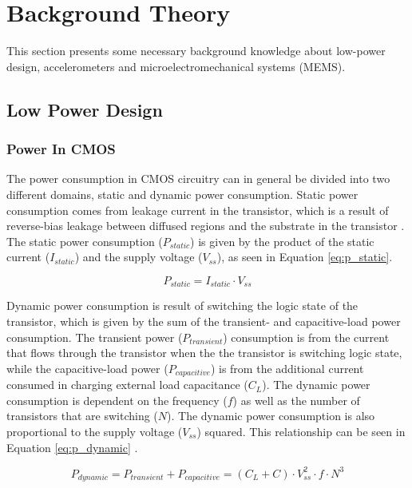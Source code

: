 \chapter{Background Theory}

This section presents some necessary background knowledge about low-power design, accelerometers and microelectromechanical systems (MEMS).

\section{Low Power Design}

\subsection{Power In CMOS}

The power consumption in CMOS circuitry can in general be divided into two different domains, static and dynamic power consumption. Static power consumption comes from leakage current in the transistor, which is a result of reverse-bias leakage between diffused regions and the
substrate in the transistor \cite{static_dynamic_power}. The static power consumption ($P_{static}$) is given by the product of the static current ($I_{static}$) and the supply voltage ($V_{ss}$), as seen in Equation \ref{eq:p_static}. 

\begin{equation}
P_{static} = I_{static} \cdot V_{ss}
\label{eq:p_static}
\end{equation}

Dynamic power consumption is result of switching the logic state of the transistor, which is given by the sum of the transient- and capacitive-load power consumption. The transient power ($P_{transient}$) consumption is from the current that flows through the transistor when the the transistor is switching logic state, while the capacitive-load power ($P_{capacitive}$) is from the additional current consumed in charging external load capacitance ($C_{L}$). The dynamic power consumption is dependent on the frequency ($f$) as well as the number of transistors that are switching ($N$). The dynamic power consumption is also proportional to the supply voltage ($V_{ss}$) squared. This relationship can be seen in Equation \ref{eq:p_dynamic} \cite{cmos_power_consumption}.

\begin{equation}
P_{dynamic} = P_{transient} + P_{capacitive} = (C_L + C) \cdot V_{ss}^{2} \cdot f \cdot N^3
\label{eq:p_dynamic}
\end{equation}


